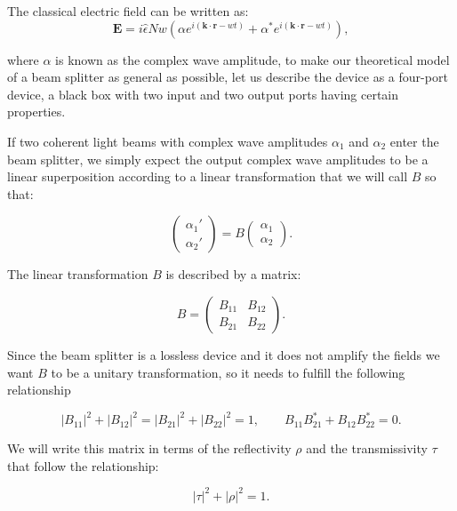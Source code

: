 \documentclass[12pt]{book}
\begin{document}
The classical electric field can be written as:
\begin{equation}
\mathbf{E}=i \hat{\epsilon}N w \left( \alpha e^{i (\mathbf{k \cdot r}-w t)}+\alpha^{*} e^{i (\mathbf{k \cdot r}-w t)} \right),
\end{equation}

where $\alpha$ is known as the complex wave amplitude, to make our theoretical model of a beam splitter as general as possible, let us describe the device as a four-port device, a black box with two input and two output ports having certain properties.

If two coherent light beams with complex wave amplitudes $\alpha_{1}$ and $\alpha_{2}$ enter the beam splitter, we simply expect the output complex wave amplitudes  to be a linear superposition  according to a linear transformation that we will call $B$ so that:

\begin{equation}
\begin{pmatrix} \alpha_{1}' \\ \alpha_{2}' \end{pmatrix}=B\begin{pmatrix} \alpha_{1} \\ \alpha_{2} \end{pmatrix}.
\end{equation}

The linear transformation $B$ is described by a matrix:

\begin{equation}
B=\begin{pmatrix} B_{11}& B_{12} \\B_{21} & B_{22} \end{pmatrix}.
\end{equation}

Since the beam splitter is a lossless device and it does not amplify the fields we want $B$ to be a unitary transformation, so it needs to fulfill the following relationship

\begin{equation}
|B_{11}|^{2}+|B_{12}|^{2}=|B_{21}|^{2}+|B_{22}|^{2}=1 ,\qquad B_{11} B_{21}^{*}+B_{12} B_{22}^{*}=0.
\end{equation}

We will write this matrix in terms of the reflectivity $\rho$ and the transmissivity $\tau$ that follow the relationship:

\begin{equation}
|\tau|^{2}+|\rho|^{2}=1.
\end{equation}
  
\end{document}
